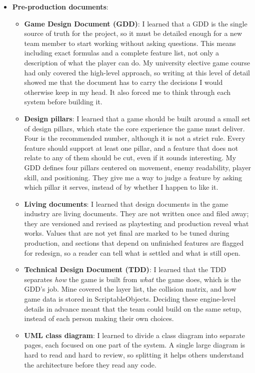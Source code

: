 \begin{itemize}[label=-]
    \item \textbf{Pre-production documents}:
    \begin{itemize}[label=$\circ$]
        \item \textbf{Game Design Document (GDD)}: I learned that a GDD is the single source of truth for the project, so it must be detailed enough for a new team member to start working without asking questions. This means including exact formulas and a complete feature list, not only a description of what the player can do. My university elective game course had only covered the high-level approach, so writing at this level of detail showed me that the document has to carry the decisions I would otherwise keep in my head. It also forced me to think through each system before building it.
        \item \textbf{Design pillars}: I learned that a game should be built around a small set of design pillars, which state the core experience the game must deliver. Four is the recommended number, although it is not a strict rule. Every feature should support at least one pillar, and a feature that does not relate to any of them should be cut, even if it sounds interesting. My GDD defines four pillars centered on movement, enemy readability, player skill, and positioning. They give me a way to judge a feature by asking which pillar it serves, instead of by whether I happen to like it.
        \pagebreak
        \item \textbf{Living documents}: I learned that design documents in the game industry are living documents. They are not written once and filed away; they are versioned and revised as playtesting and production reveal what works. Values that are not yet final are marked to be tuned during production, and sections that depend on unfinished features are flagged for redesign, so a reader can tell what is settled and what is still open.
        \item \textbf{Technical Design Document (TDD)}: I learned that the TDD separates \textit{how} the game is built from \textit{what} the game does, which is the GDD's job. Mine covered the layer list, the collision matrix, and how game data is stored in ScriptableObjects. Deciding these engine-level details in advance meant that the team could build on the same setup, instead of each person making their own choices.
        \item \textbf{UML class diagram}: I learned to divide a class diagram into separate pages, each focused on one part of the system. A single large diagram is hard to read and hard to review, so splitting it helps others understand the architecture before they read any code.
    \end{itemize}


\end{itemize}
